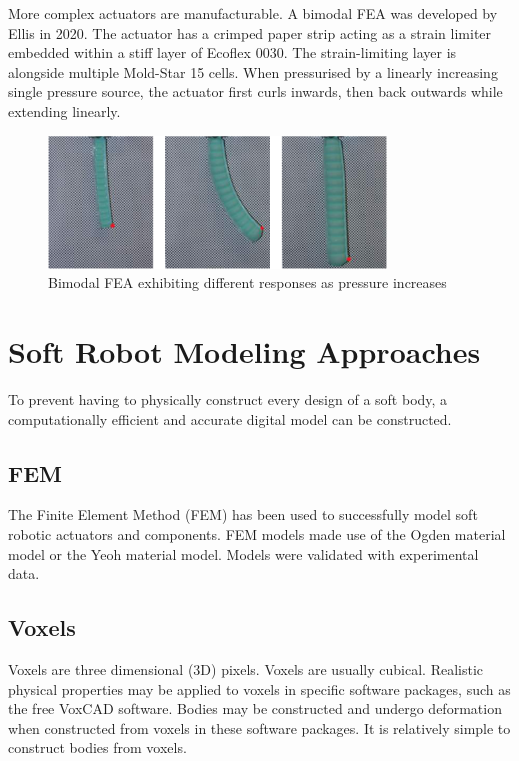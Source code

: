 More complex actuators are manufacturable. A bimodal FEA was developed by Ellis in 2020. The actuator has a crimped paper strip acting as a strain limiter embedded within a stiff layer of Ecoflex 0030. The strain-limiting layer is alongside multiple Mold-Star 15 cells. When pressurised by a linearly increasing single pressure source, the actuator  first curls inwards, then back outwards while extending linearly. \cite{Ellis2020}

\begin{figure}[H]
	\centering
	\includegraphics[width=0.8\textwidth]{BimodalActuator.png}
	\caption{Bimodal FEA exhibiting different responses as pressure increases \cite{Ellis2020}}
	\label{fig:bifea}
\end{figure}

\section{Soft Robot Modeling Approaches}

To prevent having to physically construct every design of a soft body, a computationally efficient and accurate digital model can be constructed.

\subsection{FEM}

The Finite Element Method (FEM) has been used to successfully model soft robotic actuators and components. FEM models made use of the Ogden material model or the Yeoh material model. Models were validated with experimental data. \cite{Elsayed2014, Runge2017}

\subsection{Voxels}

Voxels are three dimensional (3D) pixels. Voxels are usually cubical. Realistic physical properties may be applied to voxels in specific software packages, such as the free VoxCAD software. Bodies may be constructed and undergo deformation when constructed from voxels in these software packages. It is relatively simple to construct bodies from voxels. \cite{Cheney2013,Cheney2015}

